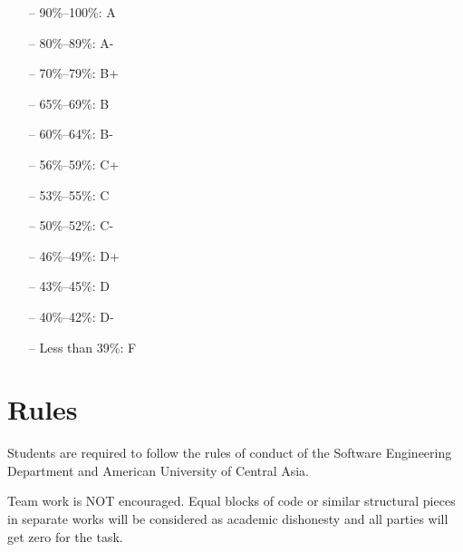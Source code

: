 \documentclass[12pt,a4paper,oneside]{article}
\begin{document}
        \begin{itemize} \itemsep-10pt \parskip0pt 
            \item[--] 90\%--100\%: A\\
            \item[--] 80\%--89\%: A-\\
            \item[--] 70\%--79\%: B+\\
            \item[--] 65\%--69\%: B\\
            \item[--] 60\%--64\%: B-\\
            \item[--] 56\%--59\%: C+\\
            \item[--] 53\%--55\%: C\\
            \item[--] 50\%--52\%: C-\\
            \item[--] 46\%--49\%: D+\\
            \item[--] 43\%--45\%: D\\
            \item[--] 40\%--42\%: D-\\
            \item[--] Less than 39\%: F
        \end{itemize}

    \section{Rules}

        Students are required to follow the rules of conduct of the Software Engineering Department and American University of Central Asia.

        Team work is NOT encouraged. Equal blocks of code or similar structural pieces in separate works will be considered as academic dishonesty and all parties will get zero for the task.
\end{document}
